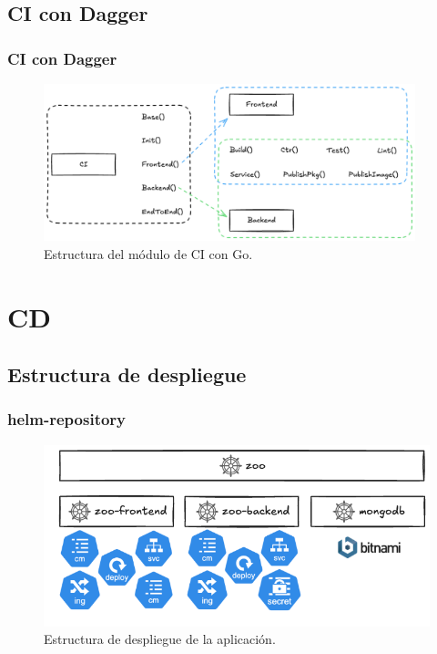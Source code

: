 \documentclass{beamer}
\begin{document}
\subsection{CI con Dagger}
\begin{frame}
    \frametitle{CI con Dagger}
    \begin{figure}
        \includegraphics[width=10.8cm]{figuras/ci_dagger_go}
        \caption{Estructura del módulo de CI con Go.}
    \end{figure}
\end{frame}

\section{CD}
\subsection{Estructura de despliegue}
\begin{frame}
    \frametitle{helm-repository}
    \begin{figure}
        \includegraphics[scale=0.4]{figuras/helm-repository}
        \caption{Estructura de despliegue de la aplicación.}
    \end{figure}
\end{frame}
\end{document}
